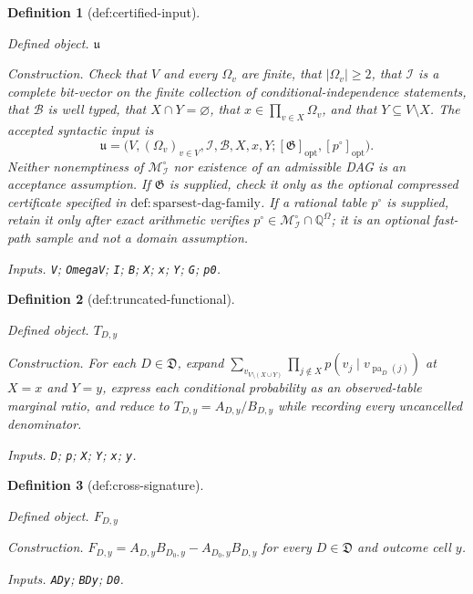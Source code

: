\documentclass{article}
\newtheorem{definition}{Definition}
\begin{document}
\begin{definition}[def:certified-input]\label{def:certified-input}
\par\smallskip\noindent\emph{Defined object.} \(\mathfrak u\)
\par\smallskip\noindent\emph{Construction.} Check that \(V\) and every \(\Omega_v\) are finite, that \(|\Omega_v|\geq2\), that \(\mathcal I\) is a complete bit-vector on the finite collection of conditional-independence statements, that \(\mathcal B\) is well typed, that \(X\cap Y=\varnothing\), that \(x\in\prod_{v\in X}\Omega_v\), and that \(Y\subseteq V\setminus X\).  The accepted syntactic input is
\[
 \mathfrak u=\bigl(V,(\Omega_v)_{v\in V},\mathcal I,\mathcal B,X,x,Y;
 [\mathfrak G]_{\mathrm{opt}},[p^{\circ}]_{\mathrm{opt}}\bigr).
\]
Neither nonemptiness of \(\mathcal M_{\mathcal I}^{\circ}\) nor existence of an admissible DAG is an acceptance assumption.  If \(\mathfrak G\) is supplied, check it only as the optional compressed certificate specified in \(\mathrm{def{:}sparsest\text{-}dag\text{-}family}\).  If a rational table \(p^{\circ}\) is supplied, retain it only after exact arithmetic verifies \(p^{\circ}\in\mathcal M_{\mathcal I}^{\circ}\cap\mathbb Q^{\Omega}\); it is an optional fast-path sample and not a domain assumption.
\par\smallskip\noindent\emph{Inputs.} \texttt{V}; \texttt{OmegaV}; \texttt{I}; \texttt{B}; \texttt{X}; \texttt{x}; \texttt{Y}; \texttt{G}; \texttt{p0}.
\end{definition}

\begin{definition}[def:truncated-functional]\label{def:truncated-functional}
\par\smallskip\noindent\emph{Defined object.} \(T_{D,y}\)
\par\smallskip\noindent\emph{Construction.} For each \(D\in\mathfrak D\), expand \(\sum_{v_{V\setminus(X\cup Y)}}\prod_{j\notin X}p(v_j\mid v_{\operatorname{pa}_D(j)})\) at \(X=x\) and \(Y=y\), express each conditional probability as an observed-table marginal ratio, and reduce to \(T_{D,y}=A_{D,y}/B_{D,y}\) while recording every uncancelled denominator.
\par\smallskip\noindent\emph{Inputs.} \texttt{D}; \texttt{p}; \texttt{X}; \texttt{Y}; \texttt{x}; \texttt{y}.
\end{definition}

\begin{definition}[def:cross-signature]\label{def:cross-signature}
\par\smallskip\noindent\emph{Defined object.} \(F_{D,y}\)
\par\smallskip\noindent\emph{Construction.} \(F_{D,y}=A_{D,y}B_{D_0,y}-A_{D_0,y}B_{D,y}\) for every \(D\in\mathfrak D\) and outcome cell \(y\).
\par\smallskip\noindent\emph{Inputs.} \texttt{ADy}; \texttt{BDy}; \texttt{D0}.
\end{definition}
\end{document}
